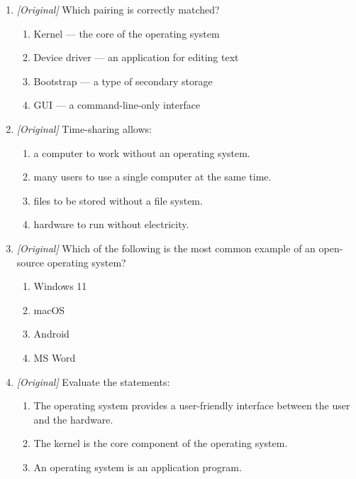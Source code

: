\documentclass[11pt]{article}
\begin{document}
\begin{enumerate}[label=\textbf{Q\arabic*.}, leftmargin=*]
  \begin{enumerate}[label=\Alph*.]
    \item compiler
    \item browser
    \item device driver
    \item spreadsheet
  \end{enumerate}
\item \textit{[Original]} Which pairing is correctly matched?
  \begin{enumerate}[label=\Alph*.]
    \item Kernel --- the core of the operating system
    \item Device driver --- an application for editing text
    \item Bootstrap --- a type of secondary storage
    \item GUI --- a command-line-only interface
  \end{enumerate}
\item \textit{[Original]} Time-sharing allows:
  \begin{enumerate}[label=\Alph*.]
    \item a computer to work without an operating system.
    \item many users to use a single computer at the same time.
    \item files to be stored without a file system.
    \item hardware to run without electricity.
  \end{enumerate}
\item \textit{[Original]} Which of the following is the most common example of
  an open-source operating system?
  \begin{enumerate}[label=\Alph*.]
    \item Windows 11
    \item macOS
    \item Android
    \item MS Word
  \end{enumerate}
\item \textit{[Original]} Evaluate the statements:
  \begin{enumerate}[label=\Roman*.]
    \item The operating system provides a user-friendly interface between the
      user and the hardware.
    \item The kernel is the core component of the operating system.
    \item An operating system is an application program.

\end{enumerate}
\end{enumerate}
\end{document}
